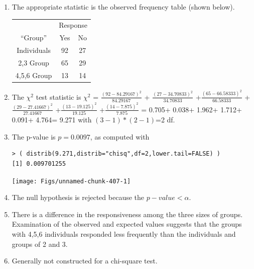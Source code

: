 \documentclass[10pt,openany]{book}\usepackage[]{graphicx}\usepackage[]{color}
\makeatletter
\newenvironment{kframe}{%
 \def\at@end@of@kframe{}%
 \ifinner\ifhmode%
  \def\at@end@of@kframe{\end{minipage}}%
  \begin{minipage}{\columnwidth}%
 \fi\fi%
 \def\FrameCommand##1{\hskip\@totalleftmargin \hskip-\fboxsep
 \colorbox{shadecolor}{##1}\hskip-\fboxsep
     \hskip-\linewidth \hskip-\@totalleftmargin \hskip\columnwidth}%
 \MakeFramed {\advance\hsize-\width
   \@totalleftmargin\z@ \linewidth\hsize
   \@setminipage}}%
 {\par\unskip\endMakeFramed%
 \at@end@of@kframe}
\newenvironment{knitrout}{}{} %
\makeatother
\begin{document}
\begin{itemize}
\begin{enumerate}
      \item The appropriate statistic is the observed frequency table (shown below).
        \begin{center}
          \begin{tabular}{|c|c|c|}
            \multicolumn{1}{c}{} & \multicolumn{2}{c}{Response} \\
            \cline{2-3}
            \multicolumn{1}{c|}{``Group''} & Yes & No \\
            \hline
            Individuals & 92 & 27 \\
            \hline
            2,3 Group & 65 & 29 \\
            \hline
            4,5,6 Group & 13 & 14 \\
            \hline
          \end{tabular}
        \end{center}
      \item The $\chi^{2}$ test statistic is $\chi^{2}$ = $\frac{(92-84.29167)^{2}}{84.29167}$ + $\frac{(27-34.70833)^{2}}{34.70833}$ +$\frac{(65-66.58333)^{2}}{66.58333}$ +$\frac{(29-27.41667)^{2}}{27.41667}$ +$\frac{(13-19.125)^{2}}{19.125}$ +$\frac{(14-7.875)^{2}}{7.875}$ = 0.705+ 0.038+ 1.962+ 1.712+ 0.091+ 4.764= 9.271 with $(3-1)*(2-1)$=2 df.
      \item The p-value is $p=0.0097$, as computed with
\begin{knitrout}
\color{fgcolor}\begin{kframe}
\begin{verbatim}
> ( distrib(9.271,distrib="chisq",df=2,lower.tail=FALSE) )
[1] 0.009701255
\end{verbatim}
\end{kframe}

{\centering \texttt{[image: Figs/unnamed-chunk-407-1]} 

}



\end{knitrout}
      \item The null hypothesis is rejected because the $p-value<\alpha$.
      \item There is a difference in the responsiveness among the three sizes of groups.  Examination of the observed and expected values suggests that the groups with 4,5,6 individuals responded less frequently than the individuals and groups of 2 and 3.
      \item Generally not constructed for a chi-square test.
    \end{enumerate}


\end{itemize}
\end{document}
